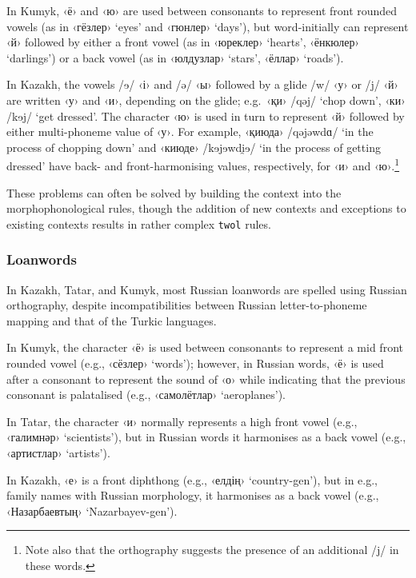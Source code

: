 \documentclass[a4paper,11pt,twocolumn]{article}
\newcommand{\gmk}[1]{{\qgmk #1}}
\begin{document}
In Kumyk, ‹ё› and ‹ю› are used between consonants to represent front rounded vowels (as in ‹гёзлер› `eyes' and ‹гюнлер› `days'), but word-initially can represent ‹й› followed by either a front vowel (as in ‹юреклер› `hearts', ‹ёнкюлер› `darlings') or a back vowel (as in ‹юлдузлар› `stars', ‹ёллар› `roads').

In Kazakh, the vowels /{\qipa ɘ}/ ‹і› and /ə/ ‹ы› followed by a glide /w/ ‹у› or /j/ ‹й› are written ‹у› and ‹и›, depending on the glide; e.g.\ ‹қи› /qəj/ `chop down', ‹ки› /k{\qipa ɘ}j/ `get dressed'.  The character ‹ю› is used in turn to represent ‹й› followed by either multi-phoneme value of ‹у›.  For example, ‹қиюда› /qəjəwd{\qipa ɑ}/ `in the process of chopping down' and ‹киюде› /k{\qipa ɘ}j{\qipa ɘ}wd{\qipa i̯ɘ}/ `in the process of getting dressed' have back- and front-harmonising values, respectively, for ‹и› and ‹ю›.\footnote{Note also that the orthography suggests the presence of an additional /j/ in these words.}

These problems can often be solved by building the context into the morphophonological rules, though the addition of new contexts and exceptions to existing contexts results in rather complex \texttt{twol} rules.

\subsubsection{Loanwords}
In Kazakh, Tatar, and Kumyk, most Russian loanwords are spelled using Russian orthography, despite incompatibilities between Russian letter-to-phoneme mapping and that of the Turkic languages.

In Kumyk, the character ‹ё› is used between consonants to represent a mid front rounded vowel (e.g., ‹сёзлер› `words'); however, in Russian words, ‹ё› is used after a consonant to represent the sound of ‹о› while indicating that the previous consonant is palatalised (e.g., ‹самолётлар› `aeroplanes').

In Tatar, the character ‹и› normally represents a high front vowel (e.g., ‹галимнәр› `scientists'), but in Russian words it harmonises as a back vowel (e.g., ‹артистлар› `artists').

In Kazakh, ‹е› is a front diphthong (e.g., ‹елдің› `country-\gmk{gen}'), but in e.g., family names with Russian morphology, it harmonises as a back vowel (e.g., ‹Назарбаевтың› `Nazarbayev-\gmk{gen}').
\end{document}
